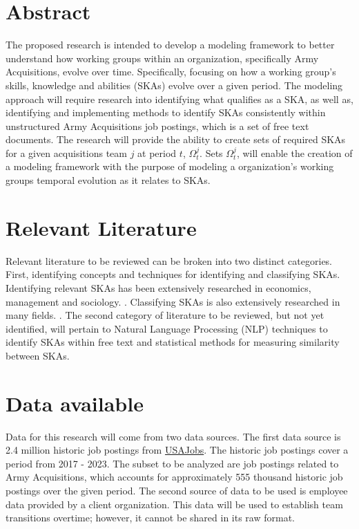 \documentclass[12pt]{article}
\begin{document}
\section*{Abstract}

The proposed research is intended to develop a modeling framework to better understand how working groups within an organization, specifically Army Acquisitions, evolve over time. Specifically, focusing on how a working group's skills, knowledge and abilities (SKAs) evolve over a given period. The modeling approach will require research into identifying what qualifies as a SKA, as well as, identifying and implementing methods to identify SKAs consistently within unstructured Army Acquisitions job postings, which is a set of free text documents. The research will provide the ability to create sets of required SKAs for a given acquisitions team $j$ at period $t$, $\Omega_t^j$. Sets $\Omega_t^j$, will enable the creation of a modeling framework with the purpose of modeling a organization's working groups temporal evolution as it relates to SKAs.

\section{Relevant Literature}

Relevant literature to be reviewed can be broken into two distinct categories. First, identifying concepts and techniques for identifying and classifying SKAs. Identifying relevant SKAs has been extensively researched in economics, management and sociology. \cite{investment_human_capital, task_specific, on_the_mechanics, diversification}. Classifying SKAs is also extensively researched in many fields. \cite{specialization_career,industry-specific_human_capital, human_capital_specificity}. The second category of literature to be reviewed, but not yet identified, will pertain to Natural Language Processing (NLP) techniques to identify SKAs within free text and statistical methods for measuring similarity between SKAs.

\section{Data available}

Data for this research will come from two data sources. The first data source is 2.4 million historic job postings from \href{https://www.usajobs.gov}{USAJobs}. The historic job postings cover a period from 2017 - 2023. The subset to be analyzed are job postings related to Army Acquisitions, which accounts for approximately 555 thousand historic job postings over the given period. The second source of data to be used is employee data provided by a client organization. This data will be used to establish team transitions overtime; however, it cannot be shared in its raw format.
\end{document}
